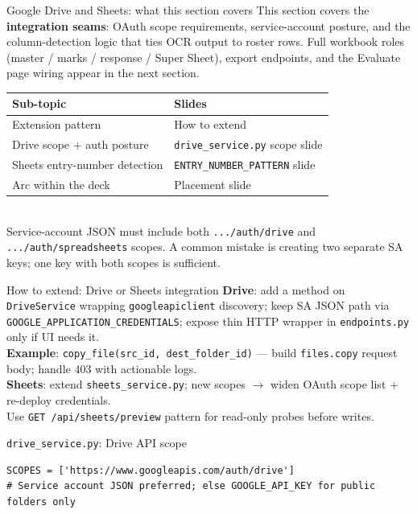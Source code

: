 \documentclass[aspectratio=169]{beamer}
\begin{document}
\begin{frame}{Google Drive and Sheets: what this section covers}
  \small
  This section covers the \textbf{integration seams}: OAuth scope requirements, service-account posture, and the column-detection logic that ties OCR output to roster rows.
  Full workbook roles (master / marks / response / Super Sheet), export endpoints, and the Evaluate page wiring appear in the next section.\\[0.4em]
  \begin{tabular}{@{}p{3.5cm}p{10.2cm}@{}}
    \toprule
    Sub-topic & Slides \\
    \midrule
    Extension pattern & How to extend \\
    Drive scope + auth posture & \texttt{drive\_service.py} scope slide \\
    Sheets entry-number detection & \texttt{ENTRY\_NUMBER\_PATTERN} slide \\
    Arc within the deck & Placement slide \\
    \bottomrule
  \end{tabular}
  \vspace{0.3em}\\
  \footnotesize Service-account JSON must include both \texttt{.../auth/drive} and \texttt{.../auth/spreadsheets} scopes. A common mistake is creating two separate SA keys; one key with both scopes is sufficient.
\end{frame}

\begin{frame}{How to extend: Drive or Sheets integration}
  \small
  \textbf{Drive}: add a method on \texttt{DriveService} wrapping \texttt{googleapiclient} discovery; keep SA JSON path via \texttt{GOOGLE\_APPLICATION\_CREDENTIALS}; expose thin HTTP wrapper in \texttt{endpoints.py} only if UI needs it.\\
  \textbf{Example}: \texttt{copy\_file(src\_id, dest\_folder\_id)} --- build \texttt{files.copy} request body; handle 403 with actionable logs.\\
  \textbf{Sheets}: extend \texttt{sheets\_service.py}; new scopes $\rightarrow$ widen OAuth scope list + re-deploy credentials.\\
  Use \texttt{GET /api/sheets/preview} pattern for read-only probes before writes.
\end{frame}

\begin{frame}[fragile]{\texttt{drive\_service.py}: Drive API scope}
\begin{lstlisting}[style=py]
SCOPES = ['https://www.googleapis.com/auth/drive']
# Service account JSON preferred; else GOOGLE_API_KEY for public folders only
\end{lstlisting}
\end{frame}
\end{document}
